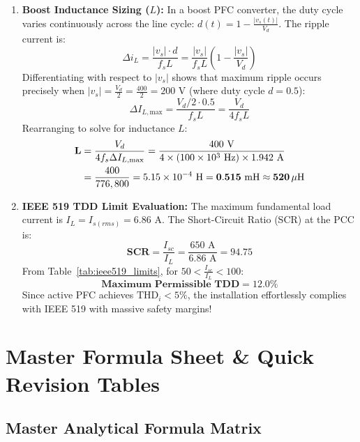 \documentclass[11pt,a4paper]{article}
\let\origsection\section
\renewcommand{\section}{\Needspace{12\baselineskip}\origsection}
\let\origsubsection\subsection
\renewcommand{\subsection}{\Needspace{7\baselineskip}\origsubsection}
\begin{document}
\begin{examplebox}
\begin{enumerate}
  \item \textbf{Boost Inductance Sizing ($L$):}
  In a boost PFC converter, the duty cycle varies continuously across the line cycle: $d(t) = 1 - \frac{|v_s(t)|}{V_d}$. The ripple current is:
  \begin{equation*}
  \Delta i_L = \frac{|v_s| \cdot d}{f_s L} = \frac{|v_s|}{f_s L} \left(1 - \frac{|v_s|}{V_d}\right)
  \end{equation*}
  Differentiating with respect to $|v_s|$ shows that maximum ripple occurs precisely when $|v_s| = \frac{V_d}{2} = \frac{400}{2} = 200\text{ V}$ (where duty cycle $d = 0.5$):
  \begin{equation*}
  \Delta I_{L,\text{max}} = \frac{V_d / 2 \cdot 0.5}{f_s L} = \frac{V_d}{4 f_s L}
  \end{equation*}
  Rearranging to solve for inductance $L$:
  \begin{align*}
  \mathbf{L} &= \frac{V_d}{4 f_s \Delta I_{L,\text{max}}} = \frac{400\text{ V}}{4 \times (100 \times 10^3\text{ Hz}) \times 1.942\text{ A}} \notag\\
  &= \frac{400}{776,800} = 5.15 \times 10^{-4}\text{ H} = \mathbf{0.515\text{ mH} \approx 520\,\mu\text{H}}
  \end{align*}

  \item \textbf{IEEE 519 TDD Limit Evaluation:}
  The maximum fundamental load current is $I_L = I_{s(rms)} = 6.86\text{ A}$. The Short-Circuit Ratio (SCR) at the PCC is:
  \begin{equation*}
  \mathbf{\text{SCR}} = \frac{I_{sc}}{I_L} = \frac{650\text{ A}}{6.86\text{ A}} = \mathbf{94.75}
  \end{equation*}
  From Table~\ref{tab:ieee519_limits}, for $50 < \frac{I_{sc}}{I_L} < 100$:
  \begin{equation*}
  \mathbf{\text{Maximum Permissible TDD}} = \mathbf{12.0\%}
  \end{equation*}
  Since active PFC achieves $\text{THD}_i < 5\%$, the installation effortlessly complies with IEEE 519 with massive safety margins!
\end{enumerate}
\end{examplebox}


\section{Master Formula Sheet \& Quick Revision Tables}

\subsection{Master Analytical Formula Matrix}
\end{document}

